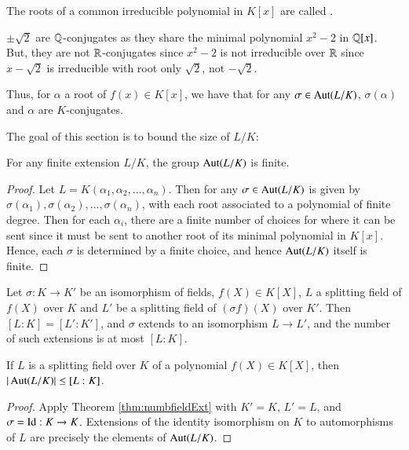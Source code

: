 \begin{defn}
    The roots of a common irreducible polynomial in $K[x]$ are called .
\end{defn}

\begin{eg}
    $\pm\sqrt{2}$ are $\mathbb Q$-conjugates as they share the minimal polynomial $x^2 - 2$ in $\mathbb Q[x]$. But, they are not $\mathbb R$-conjugates since $x^2-2$ is not irreducible over $\mathbb R$ since $x - \sqrt{2}$ is irreducible with root only $\sqrt{2}$, not $-\sqrt{2}$.
\end{eg}

Thus, for $\alpha$ a root of $f(x) \in K[x]$, we have that for any $\sigma \in \operatorname{Aut}(L/K)$, $\sigma(\alpha)$ and $\alpha$ are $K$-conjugates.

The goal of this section is to bound the size of $L/K$:

\begin{thm}
    For any finite extension $L/K$, the group $\operatorname{Aut}(L/K)$ is finite.
\end{thm}
\begin{proof}
    Let $L = K(\alpha_1,\alpha_2,...,\alpha_n)$. Then for any $\sigma \in \operatorname{Aut}(L/K)$ is given by $\sigma(\alpha_1),\sigma(\alpha_2),...,\sigma(\alpha_n)$, with each root associated to a polynomial of finite degree. Then for each $\alpha_i$, there are a finite number of choices for where it can be sent since it must be sent to another root of its minimal polynomial in $K[x]$. Hence, each $\sigma$ is determined by a finite choice, and hence $\operatorname{Aut}(L/K)$ itself is finite.
\end{proof}


\begin{thm}\label{thm:numbfieldExt}
    Let $\sigma:K\rightarrow K'$ be an isomorphism of fields, $f(X) \in K[X]$, $L$ a splitting field of $f(X)$ over $K$ and $L'$ be a splitting field of $(\sigma f)(X)$ over $K'$. Then $[L:K] = [L':K']$, and $\sigma$ extends to an isomorphism $L\rightarrow L'$, and the number of such extensions is at most $[L:K]$.
\end{thm}


\begin{cor}
    If $L$ is a splitting field over $K$ of a polynomial $f(X) \in K[X]$, then $|\operatorname{Aut}(L/K)| \leq [L:K]$.
\end{cor}
\begin{proof}
    Apply Theorem \ref{thm:numbfieldExt} with $K' = K$, $L' = L$, and $\sigma = \operatorname{Id}:K\rightarrow K$. Extensions of the identity isomorphism on $K$ to automorphisms of $L$ are precisely the elements of $\operatorname{Aut}(L/K)$. 
\end{proof}

